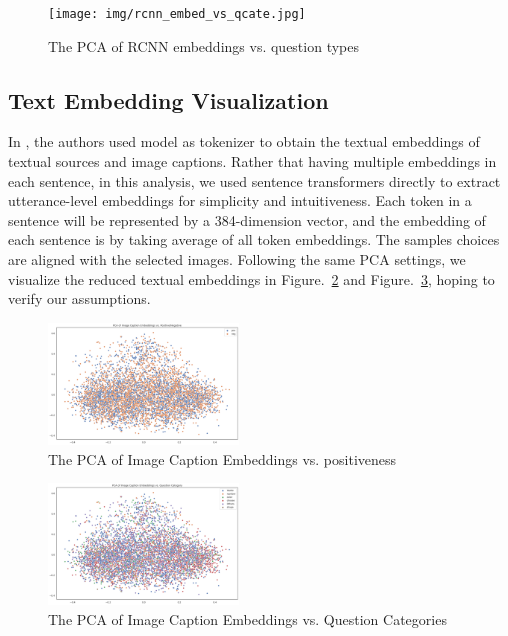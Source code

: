 \documentclass[nohyperref]{article}
\theoremstyle{plain}
\theoremstyle{definition}
\theoremstyle{remark}
\begin{document}
    \begin{figure}[h]
        \center
        \texttt{[image: img/rcnn\_embed\_vs\_qcate.jpg]}
        \caption{The PCA of RCNN embeddings vs. question types}
        \label{fig:rcnn_embed_vs_qcate}
    \end{figure}

    \subsection{Text Embedding Visualization}
    In \cite{webqa}, the authors used  model as tokenizer to obtain the textual embeddings of textual sources and image captions. Rather that having multiple embeddings in each sentence, in this analysis, we used sentence transformers \cite{sbert} directly to extract utterance-level embeddings for simplicity and intuitiveness. Each token in a sentence will be represented by a 384-dimension vector, and the embedding of each sentence is by taking average of all token embeddings. The samples choices are aligned with the selected images. Following the same PCA settings, we visualize the reduced textual embeddings in Figure.~\ref{fig:text_train_posneg_pca} and Figure.~\ref{fig:text_train_qcate_pca}, hoping to verify our assumptions.

    \begin{figure}[h]
        \center
        \includegraphics[width=0.45\textwidth]{img/text_train_posneg_pca.png}
        \caption{The PCA of Image Caption Embeddings vs. positiveness}
        \label{fig:text_train_posneg_pca}
    \end{figure}

    \begin{figure}[h]
        \center
        \includegraphics[width=0.45\textwidth]{img/text_train_qcate_pca.png}
        \caption{The PCA of Image Caption Embeddings vs. Question Categories}
        \label{fig:text_train_qcate_pca}
    \end{figure}
\end{document}

